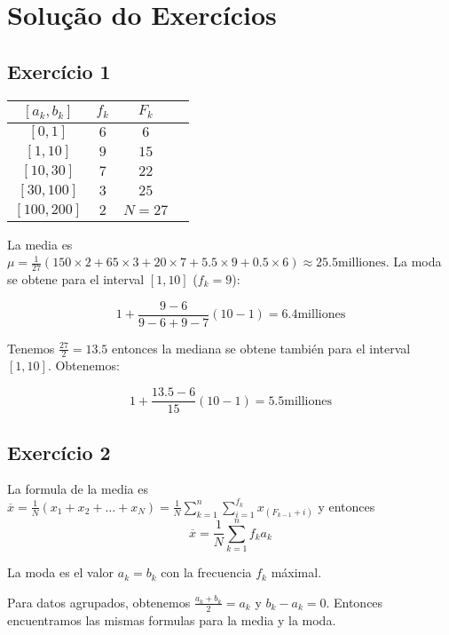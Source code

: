 \section{Solução do Exercícios}

\subsection*{Exercício 1}

\begin{center}
\begin{tabular}{| c | c | c | c | }
  \hline
  $[a_k, b_k]$ & $f_k$ & $F_k$ \\
  \hline
  $[0,1]$ & $6$ & $6$\\
  \hline
  $[1,10]$ & $9$ & $15$ \\
  \hline
  $[10,30]$ & $7$ & $22$ \\
  \hline
  $[30,100]$ & $3$ & $25$ \\
  \hline
  $[100,200]$ & $2$ & $N=27$ \\
  \hline
\end{tabular}
\end{center}

La media es $\mu = \frac{1}{27} \left(
150 \times 2 + 65 \times 3 + 20 \times 7 + 5.5 \times 9 + 0.5 \times 6 \right)
\approx 25.5 \text{milliones}$. La moda se obtene para el interval $[1,10]$
($f_k=9$):

$$
1 + \frac{9-6}{9-6 + 9-7} \left(10-1\right) = 6.4 \text{milliones}
$$

Tenemos $\frac{27}{2} = 13.5$ entonces la mediana se obtene también para
el interval $[1,10]$. Obtenemos:

$$
1 + \frac{13.5 - 6}{15} \left(10-1\right) = 5.5 \text{milliones}
$$

\subsection{Exercício 2}

La formula de la media es
$\overline{x} =
\frac{1}{N}{\left(x_1 + x_2 + \ldots + x_N\right)} =
\frac{1}{N} {\sum_{k=1}^n \sum_{i=1}^{f_k}  x_{(F_{k-1} + i)}}
$ y entonces
$$
\overline{x} =
\frac{1}{N} {\sum_{k=1}^n f_k a_k}
$$

La moda es el valor $a_k = b_k$ con la frecuencia $f_k$ máximal.

Para datos agrupados, obtenemos $\frac{a_k+b_k}{2} = a_k$ y
$b_k - a_k = 0$. Entonces encuentramos las mismas formulas para la media y la
moda.

